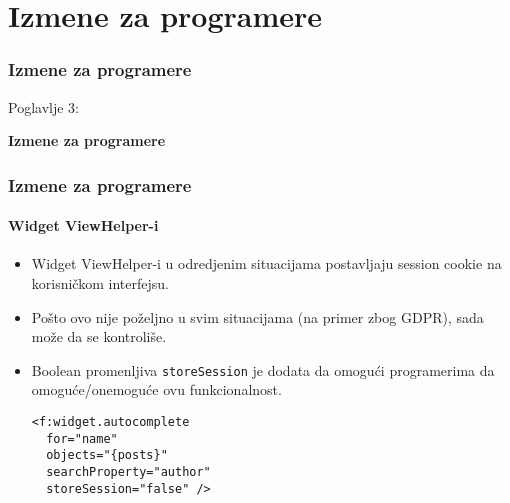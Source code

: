 %

\section{Izmene za programere}
\begin{frame}[fragile]
	\frametitle{Izmene za programere}

	\begin{center}\huge{Poglavlje 3:}\end{center}
	\begin{center}\huge{\color{typo3darkgrey}\textbf{Izmene za programere}}\end{center}

\end{frame}


\begin{frame}[fragile]
	\frametitle{Izmene za programere}
	\framesubtitle{Widget ViewHelper-i}

	\lstset{basicstyle=\smaller\ttfamily}

	\begin{itemize}
		\item Widget ViewHelper-i u odredjenim situacijama postavljaju session cookie na korisničkom interfejsu.
		\item Pošto ovo nije poželjno u svim situacijama (na primer zbog GDPR), sada može da se kontroliše.
		\item Boolean promenljiva \texttt{storeSession} je dodata da omogući programerima da omoguće/onemoguće
		 	ovu funkcionalnost.
\begin{lstlisting}
<f:widget.autocomplete
  for="name"
  objects="{posts}"
  searchProperty="author"
  storeSession="false" />
\end{lstlisting}

	\end{itemize}

\end{frame}


